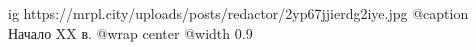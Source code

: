  
 
 
 
 

\ifcmt
  ig https://mrpl.city/uploads/posts/redactor/2yp67jjierdg2iye.jpg
	@caption Начало XX в.
  @wrap center
  @width 0.9
\fi
